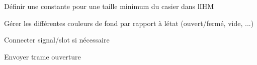 
\begin{DoxyRefList}
\item[\label{todo__todo000001}%
\Hypertarget{todo__todo000001}%
Membre \hyperlink{class_casier_aed1cd4435ff913a68b69d8119481bb8f}{Casier\+:\+:Casier} (int numero, Q\+Widget $\ast$parent=0)]Définir une constante pour une taille minimum du casier dans l\textquotesingle{}I\+HM 

Gérer les différentes couleurs de fond par rapport à l\textquotesingle{}état (ouvert/fermé, vide, ...) 

Connecter signal/slot si nécessaire  
\item[\label{todo__todo000004}%
\Hypertarget{todo__todo000004}%
Membre \hyperlink{class_casier_ac4b0de3ba58dc2bab52b049b278f4f90}{Casier\+:\+:ouvrir} ()]Envoyer trame ouverture 
\end{DoxyRefList}